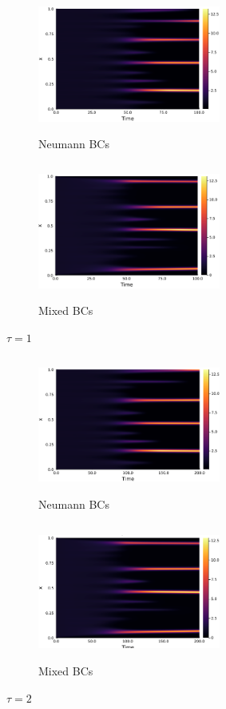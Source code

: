 \documentclass[12pt,a4paper]{article}
\begin{document}
\begin{figure}[H]
    \begin{subfigure}[b]{0.45\linewidth}
        \centering
        \includegraphics[width=6cm,height = 4.5cm]{t1neumannfixed.png}
        \caption{Neumann BCs}
        \label{}
    \end{subfigure}
    \hfill
    \begin{subfigure}[b]{0.45\linewidth}
        \centering
        \includegraphics[width=6cm,height = 4.5cm]{t1mixedfixed.png}
        \caption{Mixed BCs}
        \label{}
    \end{subfigure}
    \caption{$\tau=1$}
\end{figure}
\begin{figure}[H]
    \begin{subfigure}[b]{0.45\linewidth}
        \centering
        \includegraphics[width=6cm,height = 4.5cm]{t2neumannfixed.png}
        \caption{Neumann BCs}
        \label{}
    \end{subfigure}
    \hfill
    \begin{subfigure}[b]{0.45\linewidth}
        \centering
        \includegraphics[width=6cm,height = 4.5cm]{t2mixedfixed.png}
        \caption{Mixed BCs}
        \label{}
    \end{subfigure}
    \caption{$\tau=2$}
\end{figure}
\end{document}
